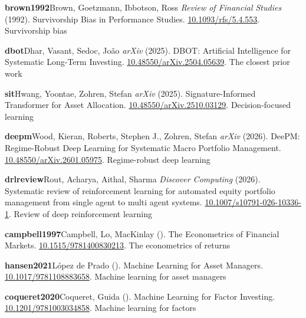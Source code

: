 \noindent\textbf{brown1992}\quad Brown, Goetzmann, Ibbotson, Ross \emph{Review of Financial Studies} (1992). Survivorship Bias in Performance Studies. \url{10.1093/rfs/5.4.553}. Survivorship bias\par
\noindent\textbf{dbot}\quad Dhar, Vasant, Sedoc, João \emph{arXiv} (2025). DBOT: Artificial Intelligence for Systematic Long-Term Investing. \url{10.48550/arXiv.2504.05639}. The closest prior work\par
\noindent\textbf{sit}\quad Hwang, Yoontae, Zohren, Stefan \emph{arXiv} (2025). Signature-Informed Transformer for Asset Allocation. \url{10.48550/arXiv.2510.03129}. Decision-focused learning\par
\noindent\textbf{deepm}\quad Wood, Kieran, Roberts, Stephen J., Zohren, Stefan \emph{arXiv} (2026). DeePM: Regime-Robust Deep Learning for Systematic Macro Portfolio Management. \url{10.48550/arXiv.2601.05975}. Regime-robust deep learning\par
\noindent\textbf{drlreview}\quad Rout, Acharya, Aithal, Sharma \emph{Discover Computing} (2026). Systematic review of reinforcement learning for automated equity portfolio management from single agent to multi agent systems. \url{10.1007/s10791-026-10336-1}. Review of deep reinforcement learning\par
\noindent\textbf{campbell1997}\quad Campbell, Lo, MacKinlay \emph{} (). The Econometrics of Financial Markets. \url{10.1515/9781400830213}. The econometrics of returns\par
\noindent\textbf{hansen2021}\quad López de Prado \emph{} (). Machine Learning for Asset Managers. \url{10.1017/9781108883658}. Machine learning for asset managers\par
\noindent\textbf{coqueret2020}\quad Coqueret, Guida \emph{} (). Machine Learning for Factor Investing. \url{10.1201/9781003034858}. Machine learning for factors\par
